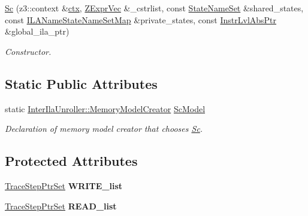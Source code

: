 \begin{DoxyCompactItemize}
\mbox{\label{classilang_1_1_sc_a5d5232369c2f8d59ef74315935fcf4b8}} 
\mbox{\hyperlink{classilang_1_1_sc_a5d5232369c2f8d59ef74315935fcf4b8}{Sc}} (z3\+::context \&\mbox{\hyperlink{classilang_1_1_memory_model_af2ca71c0d173e7cb5502d05a2e4cf24c}{ctx}}, \mbox{\hyperlink{classilang_1_1_memory_model_ab0d3de967acef0330edf4d65d5782ce5}{Z\+Expr\+Vec}} \&\+\_\+cstrlist, const \mbox{\hyperlink{classilang_1_1_memory_model_a0950692c6a72496a2dda46aa985cb337}{State\+Name\+Set}} \&shared\+\_\+states, const \mbox{\hyperlink{classilang_1_1_memory_model_a9e23cd7d325902a4ab1a4f5d8acea67b}{I\+L\+A\+Name\+State\+Name\+Set\+Map}} \&private\+\_\+states, const \mbox{\hyperlink{namespaceilang_ad1b30fdf347e493b3937143da05d1a72}{Instr\+Lvl\+Abs\+Ptr}} \&global\+\_\+ila\+\_\+ptr)
\begin{DoxyCompactList}\small\item\em Constructor. \end{DoxyCompactList}\end{DoxyCompactItemize}
\subsection*{Static Public Attributes}
\begin{DoxyCompactItemize}
\item 
\mbox{\label{classilang_1_1_sc_a9efc68e08d6e861c3ab533655c82aa62}} 
static \mbox{\hyperlink{classilang_1_1_inter_ila_unroller_a3f06eb0ada6cdaee6ac0e1f7ad511b1c}{Inter\+Ila\+Unroller\+::\+Memory\+Model\+Creator}} \mbox{\hyperlink{classilang_1_1_sc_a9efc68e08d6e861c3ab533655c82aa62}{Sc\+Model}}
\begin{DoxyCompactList}\small\item\em Declaration of memory model creator that chooses \mbox{\hyperlink{classilang_1_1_sc}{Sc}}. \end{DoxyCompactList}\end{DoxyCompactItemize}
\subsection*{Protected Attributes}
\begin{DoxyCompactItemize}
\item 
\mbox{\label{classilang_1_1_sc_a774894411d28e737eba215f7e5dc12ad}} 
\mbox{\hyperlink{classilang_1_1_memory_model_adf275c2b36d17acd5b6e782c1eca7f92}{Trace\+Step\+Ptr\+Set}} {\bfseries W\+R\+I\+T\+E\+\_\+list}
\item 
\mbox{\label{classilang_1_1_sc_a3eb66a134282052e2823c048987b1c88}} 
\mbox{\hyperlink{classilang_1_1_memory_model_adf275c2b36d17acd5b6e782c1eca7f92}{Trace\+Step\+Ptr\+Set}} {\bfseries R\+E\+A\+D\+\_\+list}
\end{DoxyCompactItemize}
